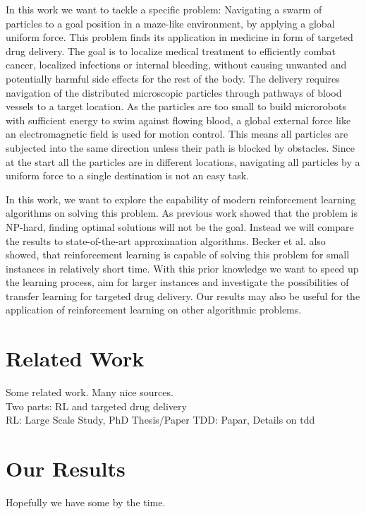  In this work we want to tackle a specific problem: Navigating a swarm of particles to a goal position in a maze-like environment, by applying a global uniform force. This problem finds its application in medicine in form of targeted drug delivery. The goal is to localize medical treatment to efficiently combat cancer, localized infections or internal bleeding, without causing unwanted and potentially harmful side effects for the rest of the body. The delivery requires navigation of the distributed microscopic particles through pathways of blood vessels to a target location. As the particles are too small to build microrobots with sufficient energy to swim against flowing blood, a global external force like an electromagnetic field is used for motion control. This means all particles are subjected into the same direction unless their path is blocked by obstacles. Since at the start all the particles are in different locations, navigating all particles by a uniform force to a single destination is not an easy task.

 In this work, we want to explore the capability of modern reinforcement learning algorithms on solving this problem. As previous work \cite{becker2020} showed that the problem is NP-hard, finding optimal solutions will not be the goal. Instead we will compare the results to state-of-the-art approximation algorithms. Becker et al. also showed, that reinforcement learning is capable of solving this problem for small instances in relatively short time. With this prior knowledge we want to speed up the learning process, aim for larger instances and investigate the possibilities of transfer learning for targeted drug delivery. Our results may also be useful for the application of reinforcement learning on other algorithmic problems.

 \section{Related Work} \label{sec:RelatedWork}
 Some related work. Many nice sources. \\
 Two parts: RL and targeted drug delivery \\
 RL: Large Scale Study, PhD Thesis/Paper
 TDD: Papar, Details on tdd


\section{Our Results} \label{sec:Results}
Hopefully we have some by the time.